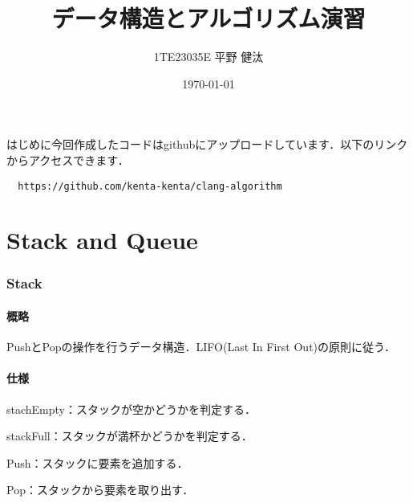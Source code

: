 \documentclass{ltjsarticle}
\begin{document}
\title{データ構造とアルゴリズム演習}
\author{1TE23035E 平野 健汰}
\date{\today}

\maketitle

はじめに今回作成したコードはgithubにアップロードしています．以下のリンクからアクセスできます．
\begin{verbatim}
  https://github.com/kenta-kenta/clang-algorithm
\end{verbatim}

\part{Stack and Queue}

\section{Stack}
\subsection{概略}
PushとPopの操作を行うデータ構造．LIFO(Last In First Out)の原則に従う．

\subsection{仕様}

\noindent stachEmpty：スタックが空かどうかを判定する．

\noindent stackFull：スタックが満杯かどうかを判定する．

\noindent Push：スタックに要素を追加する．

\noindent Pop：スタックから要素を取り出す．
\end{document}
